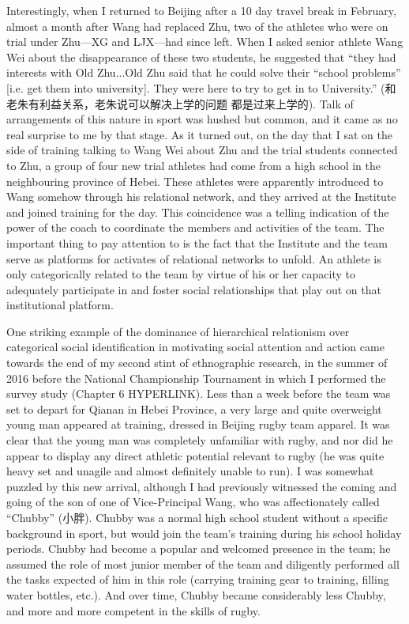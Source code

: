   Interestingly, when I returned to Beijing after a 10 day travel break in February, almost a month after Wang had replaced Zhu, two of the athletes who were on trial under Zhu---XG and LJX---had since left.  When I asked senior athlete Wang Wei about the disappearance of these two students, he suggested that ``they had interests with Old Zhu...Old Zhu said that he could solve their ``school problems'' [i.e. get them into university]. They were here to try to get in to University.'' (和老朱有利益关系，老朱说可以解决上学的问题 都是过来上学的). Talk of arrangements of this nature in sport was hushed but common, and it came as no real surprise to me by that stage.  As it turned out, on the day that I sat on the side of training talking to Wang Wei about Zhu and the trial students connected to Zhu, a group of four new trial athletes had come from a high school in the neighbouring province of Hebei.  These athletes were apparently introduced to Wang somehow through his relational network, and they arrived at the Institute and joined training for the day. This coincidence was a telling indication of the power of the coach to coordinate the members and activities of the team. The important thing to pay attention to is the fact that the Institute and the team serve as platforms for activates of relational networks to unfold. An athlete is only categorically related to the team by virtue of his or her capacity to adequately participate in and foster social relationships that play out on that institutional platform.

  One striking example of the dominance of hierarchical relationism over categorical social identification in motivating social attention and action came towards the end of my second stint of ethnographic research, in the summer of 2016 before the National Championship Tournament in which I performed the survey study (Chapter 6 HYPERLINK).  Less than a week before the team was set to depart for Qianan in Hebei Province, a very large and quite overweight young man appeared at training, dressed in Beijing rugby team apparel.  It was clear that the young man was completely unfamiliar with rugby, and nor did he appear to display any direct athletic potential relevant to rugby (he was quite heavy set and unagile and almost definitely unable to run).  I was somewhat puzzled by this new arrival, although I had previously witnessed the coming and going of the son of one of Vice-Principal Wang, who was affectionately called ``Chubby'' (小胖).
  Chubby was a normal high school student without a specific background in sport, but would join the team's training during his school holiday periods.  Chubby had become a popular and welcomed presence in the team; he assumed the role of most junior member of the team and diligently performed all the tasks expected of him in this role (carrying training gear to training, filling water bottles, etc.).  And over time, Chubby became considerably less Chubby, and more and more competent in the skills of rugby.

